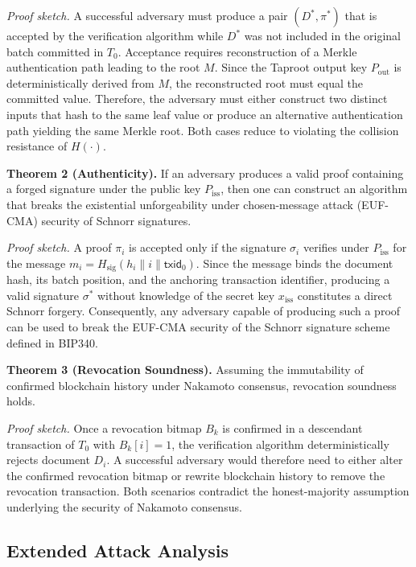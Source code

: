 \documentclass{IEEEoj}
\begin{document}
\emph{Proof sketch.}  
A successful adversary must produce a pair $(D^*, \pi^*)$ that is accepted by the verification algorithm while $D^*$ was not included in the original batch committed in $T_0$. Acceptance requires reconstruction of a Merkle authentication path leading to the root $M$. Since the Taproot output key $P_{\mathrm{out}}$ is deterministically derived from $M$, the reconstructed root must equal the committed value. Therefore, the adversary must either construct two distinct inputs that hash to the same leaf value or produce an alternative authentication path yielding the same Merkle root. Both cases reduce to violating the collision resistance of $H(\cdot)$.

\textbf{Theorem 2 (Authenticity).}  
If an adversary produces a valid proof containing a forged signature under the public key $P_{\mathrm{iss}}$, then one can construct an algorithm that breaks the existential unforgeability under chosen-message attack (EUF-CMA) security of Schnorr signatures.

\emph{Proof sketch.}  
A proof $\pi_i$ is accepted only if the signature $\sigma_i$ verifies under $P_{\mathrm{iss}}$ for the message $m_i = H_{\mathrm{sig}}(h_i \parallel i \parallel \mathsf{txid}_0)$. Since the message binds the document hash, its batch position, and the anchoring transaction identifier, producing a valid signature $\sigma^*$ without knowledge of the secret key $x_{\mathrm{iss}}$ constitutes a direct Schnorr forgery. Consequently, any adversary capable of producing such a proof can be used to break the EUF-CMA security of the Schnorr signature scheme defined in BIP340.

\textbf{Theorem 3 (Revocation Soundness).}  
Assuming the immutability of confirmed blockchain history under Nakamoto consensus, revocation soundness holds.

\emph{Proof sketch.}  
Once a revocation bitmap $B_k$ is confirmed in a descendant transaction of $T_0$ with $B_k[i] = 1$, the verification algorithm deterministically rejects document $D_i$. A successful adversary would therefore need to either alter the confirmed revocation bitmap or rewrite blockchain history to remove the revocation transaction. Both scenarios contradict the honest-majority assumption underlying the security of Nakamoto consensus.

\subsection{Extended Attack Analysis}
\end{document}
